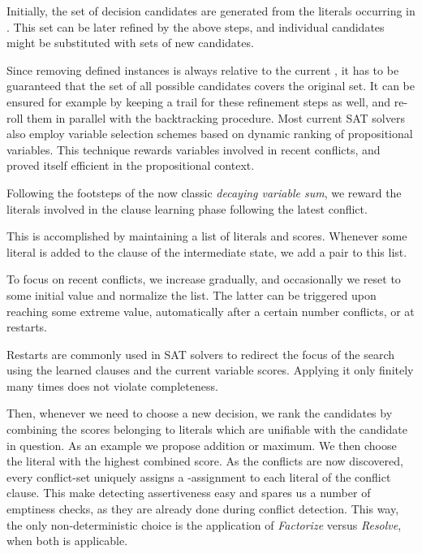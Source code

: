 \documentclass[a4paper]{article}
\begin{document}
{Initially, the set of decision candidates are generated from the literals occurring in . 
This set can be later refined by the above steps, and individual candidates might be substituted with sets of new candidates.

Since removing defined instances is always relative to the current , it has to be guaranteed that the set of all possible candidates
covers the original set.
It can be ensured for example by keeping a trail for these refinement steps as well, and re-roll them in parallel with the backtracking procedure.
Most current SAT solvers also employ variable selection schemes based on dynamic ranking of propositional variables. 
This technique rewards variables involved in recent conflicts, and proved itself efficient in the propositional context. 

Following the footsteps of the now classic \emph{decaying variable sum}, we reward the literals 
involved in the clause learning phase following the latest conflict. 

This is accomplished by maintaining a list of literals and scores. 
Whenever some literal  is added to the clause of the intermediate state, we add a pair  to this list.

To focus on recent conflicts, we increase  gradually, and occasionally we reset  to some initial value and normalize the list.
The latter can be triggered upon reaching some extreme value, automatically after a certain number conflicts, or 
at restarts. 

Restarts are commonly used in SAT solvers to redirect the focus of the search using the learned clauses and the current variable scores. 
Applying it only finitely many times does not violate completeness.

Then, whenever we need to choose a new decision, we rank the candidates by combining the scores belonging to literals which are unifiable with
the candidate in question. As an example we propose addition or maximum. We then choose the literal with the highest combined score.
As the conflicts are now discovered, every conflict-set uniquely assigns a -assignment to each literal of 
the conflict clause. This make detecting assertiveness easy and spares us a number of emptiness checks, as they 
are already done during conflict detection. 
This way, the only non-deterministic choice is the application of \emph{Factorize} versus \emph{Resolve}, when both is applicable. 

}
\end{document}
